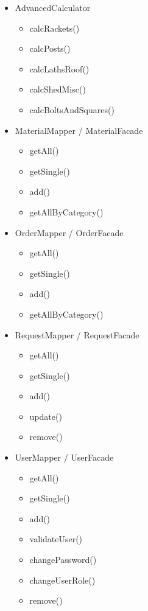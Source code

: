 \documentclass[11pt]{report}
\begin{document}
\begin{itemize}
\item AdvancedCalculator
\begin{itemize}
\renewcommand\labelitemi{--}
\item calcRackets()
\item calcPosts()
\item calcLathsRoof()
\item calcShedMisc()
\item calcBoltsAndSquares()
\end{itemize}
\item MaterialMapper / MaterialFacade
\begin{itemize}
\renewcommand\labelitemi{--}
\item getAll()
\item getSingle()
\item add()
\item getAllByCategory()
\end{itemize}
\item OrderMapper / OrderFacade
\begin{itemize}
\renewcommand\labelitemi{--}
\item getAll()
\item getSingle()
\item add()
\item getAllByCategory()
\end{itemize}
\newpage
\item RequestMapper / RequestFacade
\begin{itemize}
\renewcommand\labelitemi{--}
\item getAll()
\item getSingle()
\item add()
\item update()
\item remove()
\end{itemize}
\item UserMapper / UserFacade
\begin{itemize}
\renewcommand\labelitemi{--}
\item getAll()
\item getSingle()
\item add()
\item validateUser()
\item changePassword()
\item changeUserRole()
\item remove()
\end{itemize}
\end{itemize}
\end{document}
